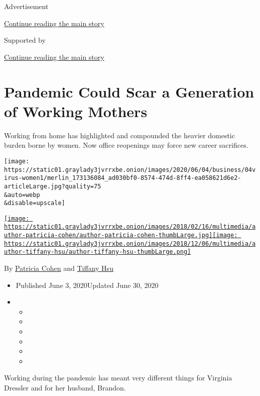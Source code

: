 Advertisement

\protect\hyperlink{after-top}{Continue reading the main story}

Supported by

\protect\hyperlink{after-sponsor}{Continue reading the main story}

\hypertarget{pandemic-could-scar-a-generation-of-working-mothers}{%
\section{Pandemic Could Scar a Generation of Working
Mothers}\label{pandemic-could-scar-a-generation-of-working-mothers}}

Working from home has highlighted and compounded the heavier domestic
burden borne by women. Now office reopenings may force new career
sacrifices.

\texttt{[image: https://static01.graylady3jvrrxbe.onion/images/2020/06/04/business/04virus-women1/merlin\_173136084\_ad030bf0-8574-474d-8ff4-ea058621d6e2-articleLarge.jpg?quality=75\\\&auto=webp\\\&disable=upscale]}

\href{https://www.nytimes3xbfgragh.onion/by/patricia-cohen}{\texttt{[image: https://static01.graylady3jvrrxbe.onion/images/2018/02/16/multimedia/author-patricia-cohen/author-patricia-cohen-thumbLarge.jpg]}}\href{https://www.nytimes3xbfgragh.onion/by/tiffany-hsu}{\texttt{[image: https://static01.graylady3jvrrxbe.onion/images/2018/12/06/multimedia/author-tiffany-hsu/author-tiffany-hsu-thumbLarge.png]}}

By \href{https://www.nytimes3xbfgragh.onion/by/patricia-cohen}{Patricia
Cohen} and
\href{https://www.nytimes3xbfgragh.onion/by/tiffany-hsu}{Tiffany Hsu}

\begin{itemize}
\item
  Published June 3, 2020Updated June 30, 2020
\item
  \begin{itemize}
  \item
  \item
  \item
  \item
  \item
  \item
  \end{itemize}
\end{itemize}

Working during the pandemic has meant very different things for Virginia
Dressler and for her husband, Brandon.

